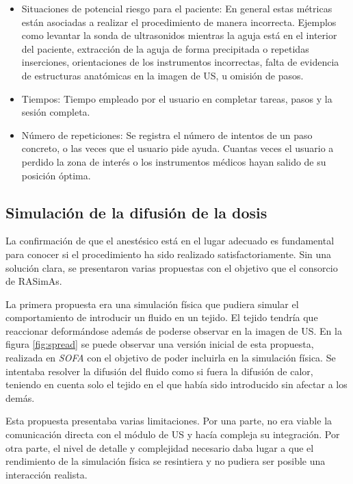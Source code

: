 \begin{itemize}
    \item Situaciones de potencial riesgo para el paciente: En general estas métricas están asociadas a realizar el procedimiento de manera incorrecta. Ejemplos como levantar la sonda de ultrasonidos mientras la aguja está en el interior del paciente, extracción de la aguja de forma precipitada o repetidas inserciones, orientaciones de los instrumentos incorrectas, falta de evidencia de estructuras anatómicas en la imagen de \ac{US}, u omisión de pasos. 
    
    \item Tiempos: Tiempo empleado por el usuario en completar tareas, pasos y la sesión completa. 
    
    \item Número de repeticiones: Se registra el número de intentos de un paso concreto, o las veces que el usuario pide ayuda. Cuantas veces el usuario a perdido la zona de interés o los instrumentos médicos hayan salido de su posición óptima.
\end{itemize}


\subsection{Simulación de la difusión de la dosis}
\label{course:dosis}
La confirmación de que el anestésico está en el lugar adecuado es fundamental para conocer si el procedimiento ha sido realizado satisfactoriamente. Sin una solución clara, se presentaron varias propuestas con el objetivo que el consorcio de \ac{RASimAs}.

La primera propuesta era una simulación física que pudiera simular el comportamiento de introducir un fluido en un tejido. El tejido tendría que reaccionar deformándose además de poderse observar en la imagen de \ac{US}. En la figura \ref{fig:spread} se puede observar una versión inicial de esta propuesta, realizada en \emph{SOFA} con el objetivo de poder incluirla en la simulación física. Se intentaba resolver la difusión del fluido como si fuera la difusión de calor, teniendo en cuenta solo el tejido en el que había sido introducido sin afectar a los demás.

Esta propuesta presentaba varias limitaciones. Por una parte, no era viable la comunicación directa con el módulo de \ac{US} y hacía compleja su integración. Por otra parte, el nivel de detalle y complejidad necesario daba lugar a que el rendimiento de la simulación física se resintiera y no pudiera ser posible una interacción realista.

